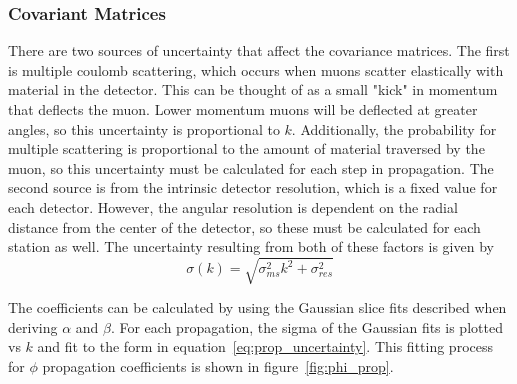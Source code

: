 \subsubsection{Covariant Matrices} \label{sec:kbmtf_cov}
There are two sources of uncertainty that affect the covariance matrices. The first is multiple coulomb scattering, which occurs when muons scatter elastically with material in the detector. This can be thought of as a small "kick" in momentum that deflects the muon. Lower momentum muons will be deflected at greater angles, so this uncertainty is proportional to $k$. Additionally, the probability for multiple scattering is proportional to the amount of material traversed by the muon, so this uncertainty must be calculated for each step in propagation. The second source is from the intrinsic detector resolution, which is a fixed value for each detector. However, the angular resolution is dependent on the radial distance from the center of the detector, so these must be calculated for each station as well. The uncertainty resulting from both of these factors is given by
\begin{equation}
	\label{eq:prop_uncertainty}
	\sigma(k)=\sqrt{\sigma_{ms}^2k^2+\sigma_{res}^2}
\end{equation}

The coefficients can be calculated by using the Gaussian slice fits described when deriving $\alpha$ and $\beta$. For each propagation, the sigma of the Gaussian fits is plotted vs $k$ and fit to the form in equation~\ref{eq:prop_uncertainty}. This fitting process for $\phi$ propagation coefficients is shown in figure~\ref{fig:phi_prop}.

